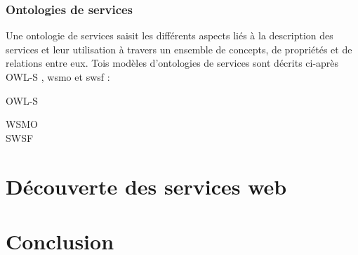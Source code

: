 	    \subsubsection{Ontologies de services} 
	    Une ontologie de services saisit les différents aspects liés à la description des services et leur 
	    utilisation à travers un ensemble de concepts, de propriétés et de relations entre eux. Tois modèles
	    d'ontologies de services sont décrits ci-après \textsc{OWL-S} \cite{martin2004owl}, \acrshort{wsmo} 
	    \cite{de2006web} et \acrshort{swsf} \cite{battle2005semantic}:

	    \begin{description}
		\item[OWL-S]
		    \cite{mcilraith2003bringing}
		\item[WSMO ]
		\item[SWSF ]
	    \end{description}

\section{Découverte des services web}

\section{Conclusion}
